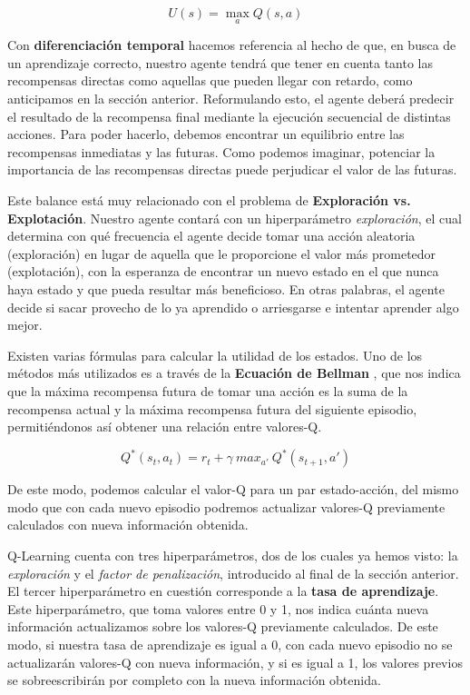 $$U(s) = \max_{a}Q(s, a)$$

Con \textbf{diferenciación temporal} hacemos referencia al hecho de que, en busca de un aprendizaje correcto, nuestro agente tendrá que tener en cuenta tanto las recompensas directas como aquellas que pueden llegar con retardo, como anticipamos en la sección anterior. Reformulando esto, el agente deberá predecir el resultado de la recompensa final mediante la ejecución secuencial de distintas acciones. Para poder hacerlo, debemos encontrar un equilibrio entre las recompensas inmediatas y las futuras. Como podemos imaginar, potenciar la importancia de las recompensas directas puede perjudicar el valor de las futuras.

Este balance está muy relacionado con el problema de \textbf{Exploración vs. Explotación}. Nuestro agente contará con un hiperparámetro \textit{exploración}, el cual determina con qué frecuencia el agente decide tomar una acción aleatoria (exploración) en lugar de aquella que le proporcione el valor más prometedor (explotación), con la esperanza de encontrar un nuevo estado en el que nunca haya estado y que pueda resultar más beneficioso. En otras palabras, el agente decide si sacar provecho de lo ya aprendido o arriesgarse e intentar aprender algo mejor.

Existen varias fórmulas para calcular la utilidad de los estados. Uno de los métodos más utilizados es a través de la \textbf{Ecuación de Bellman} \citet{Baird1995}, que nos indica que la máxima recompensa futura de tomar una acción es la suma de la recompensa actual y la máxima recompensa futura del siguiente episodio, permitiéndonos así obtener una relación entre valores-Q.

$$Q^*(s_{t}, a_{t}) = r_{t} + \gamma\ max_{a'}\ Q^*(s_{t+1}, a')$$

De este modo, podemos calcular el valor-Q para un par estado-acción, del mismo modo que con cada nuevo episodio podremos actualizar valores-Q previamente calculados con nueva información obtenida.

Q-Learning cuenta con tres hiperparámetros, dos de los cuales ya hemos visto: la \textit{exploración} y el \textit{factor de penalización}, introducido al final de la sección anterior. El tercer hiperparámetro en cuestión corresponde a la \textbf{tasa de aprendizaje}. Este hiperparámetro, que toma valores entre 0 y 1, nos indica cuánta nueva información actualizamos sobre los valores-Q previamente calculados. De este modo, si nuestra tasa de aprendizaje es igual a 0, con cada nuevo episodio no se actualizarán valores-Q con nueva información, y si es igual a 1, los valores previos se sobreescribirán por completo con la nueva información obtenida.

